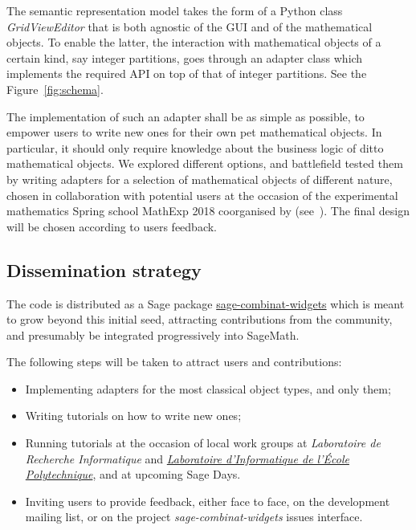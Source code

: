 \documentclass{deliverablereport}
\begin{document}
The semantic representation model takes the form of a Python class
\emph{GridViewEditor} that is both agnostic of the GUI and of the
mathematical objects. To enable the latter, the interaction with
mathematical objects of a certain kind, say integer partitions, goes
through an adapter class which implements the required API on top of
that of integer partitions. See the Figure~\ref{fig:schema}.

The implementation of such an adapter shall be as simple as possible,
to empower users to write new ones for their own pet mathematical
objects. In particular, it should only require knowledge about the
business logic of ditto mathematical objects. We explored different
options, and battlefield tested them by writing adapters for a
selection of mathematical objects of different nature, chosen in
collaboration with potential users at the occasion of the experimental
mathematics Spring school MathExp 2018 coorganised by \ODK
(see~). The final design will be
chosen according to users feedback.

\subsection{Dissemination strategy}

The code is distributed as a Sage package
\href{https://github.com/sagemath/sage-combinat-widgets/}{sage-combinat-widgets}
which is meant to grow beyond this initial seed, attracting
contributions from the community, and presumably be integrated
progressively into SageMath.

The following steps will be taken to attract users and contributions:
\begin{itemize}
  \item Implementing adapters for the most classical object types, and
    only them;
  \item Writing tutorials on how to write new ones;
  \item Running tutorials at the occasion of local work groups at
    \emph{Laboratoire de Recherche Informatique} and
    \emph{\href{https://www.lix.polytechnique.fr/}{Laboratoire
        d'Informatique de l'École Polytechnique}}, and at upcoming
    Sage Days.
  \item Inviting users to provide feedback, either face to face, on
    the development mailing list, or on the project
    \emph{sage-combinat-widgets} issues interface.
\end{itemize}
\end{document}
